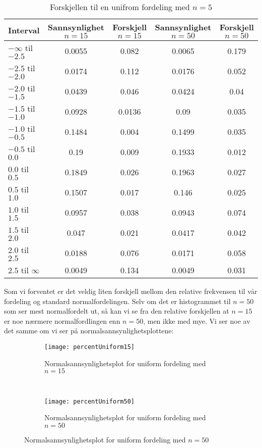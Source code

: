 \documentclass[a4paper,norsk, 10pt]{article}
\begin{document}
\begin{table}[H]
\centering
\begin{tabular}{|l|c| c| c| c|}
\hline
Interval & Sannsynlighet $n = 15$ & Forskjell $n = 15$ &Sannsynlighet $n = 50$ & Forskjell $n = 50$ \\
\hline
$- \infty$ til $-2.5$ & 0.0055 & 0.082 & 0.0065 & 0.179\\
$- 2.5$ til $-2.0$ & 0.0174 & 0.112 & 0.0176 & 0.052\\
$- 2.0$ til $-1.5$ & 0.0439 & 0.046 & 0.0424 & 0.04\\
$- 1.5$ til $-1.0$ & 0.0928 & 0.0136 & 0.09 & 0.035\\
$- 1.0$ til $-0.5$ & 0.1484 & 0.004 & 0.1499 & 0.035\\
$- 0.5$ til $0.0$ & 0.19 & 0.009 & 0.1933 & 0.012\\

$ 0.0$ til $0.5$ & 0.1849 & 0.026 & 0.1963 & 0.027\\
$ 0.5$ til $1.0$ & 0.1507 & 0.017 & 0.146 & 0.025\\
$ 1.0$ til $1.5$ & 0.0957 & 0.038 & 0.0943 & 0.074\\
$ 1.5$ til $2.0$ & 0.047 & 0.021 & 0.0417 & 0.042\\
$ 2.0$ til $2.5$ & 0.0188 & 0.076 & 0.0171 & 0.058\\
$ 2.5$ til $\infty$ & 0.0049 & 0.134 & 0.0049 & 0.031\\ \hline
\end{tabular}
\caption{Forskjellen til en unifrom fordeling med $n = 5$}
\label{tab:forskjellUniform5}
\end{table}
Som vi forventet er det veldig liten forskjell mellom den relative frekvensen til vår fordeling og standard normalfordelingen. Selv om det er histogrammet til $n = 50$ som ser mest normalfordelt ut, så kan vi se fra den relative forskjellen at $n=15$ er noe nærmere normalfordlingen enn $n = 50$, men ikke med mye. Vi ser noe av det samme om vi ser på normalsannsynlighetsplottene:

\begin{figure}[H]
\centering
	\begin{subfigure}[b]{0.40\textwidth}
	\centering
        \texttt{[image: percentUniform15]}
        \caption{Normalsannsynlighetsplot for uniform fordeling med $n = 15$}
        \label{fig:PU15}
    \end{subfigure}
    ~
    \begin{subfigure}[b]{0.35\textwidth}
    \centering
        \texttt{[image: percentUniform50]}
        \caption{Normalsannsynlighetsplot for uniform fordeling med $n = 50$}
        \label{fig:PU50}
    \end{subfigure}
\end{figure}
\end{document}
